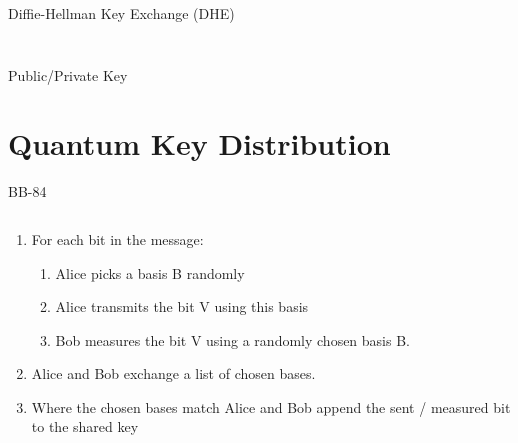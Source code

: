 \documentclass{beamer}
\begin{document}
\begin{frame}{Diffie-Hellman Key Exchange (DHE)}
\begin{columns}
\begin{column}{\textwidth}
\begin{figure}
{}
				\end{figure}
			\end{column}
		\end{columns}
	\end{frame}


	\begin{frame}{Public/Private Key} %

	\end{frame}

	\section{Quantum Key Distribution}

	\begin{frame}{BB-84} %
		\begin{columns}
			\begin{column}{\textwidth}
				\begin{enumerate}
					\item For each bit in the message:
						\begin{enumerate}
							\item Alice picks a basis B randomly
							\item Alice transmits the bit V using this basis
							\item Bob measures the bit V using a randomly chosen basis B.
						\end{enumerate}
					\item Alice and Bob exchange a list of chosen bases.
					\item Where the chosen bases match Alice and Bob append the sent / measured bit to the shared key
				\end{enumerate}
			\end{column}
		\end{columns}
	\end{frame}
	
\end{document}
